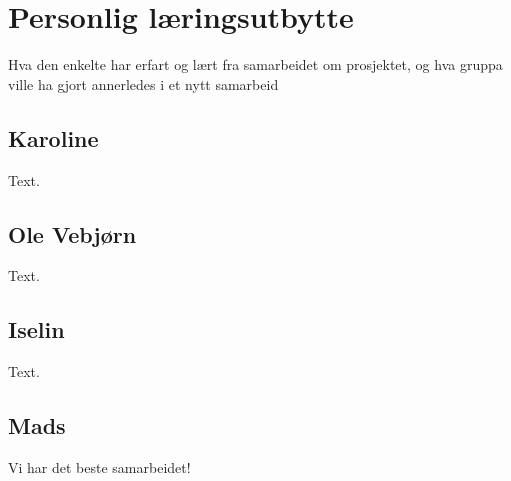 \section{Personlig læringsutbytte}
Hva den enkelte har erfart og lært fra samarbeidet om prosjektet, og hva gruppa ville ha gjort annerledes i et nytt samarbeid

\subsection{Karoline}
Text.
\subsection{Ole Vebjørn}
Text.
\subsection{Iselin}
Text.
\subsection{Mads}
Vi har det beste samarbeidet!